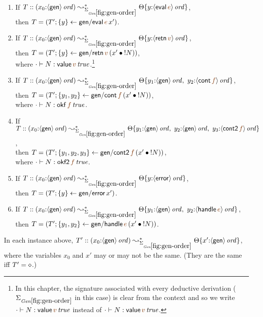 \bigskip
\begin{lemma}~
\begin{enumerate}
\item If 
   $T :: (x_0{:}\istrue{\susp{\sf gen}}) \leadsto^*_{\siggenorder}
         \tackon{\Theta}{y{:}\istrue{\susp{{\sf eval}\,\lf{e}}}}$,
\\ then 
   $T = \left(T'; \trstep{y}{{\sf gen/eval}\,\lf{e}\,x'}\right)$.
\medskip
\item If 
   $T :: (x_0{:}\istrue{\susp{\sf gen}}) \leadsto^*_{\siggenorder}
         \tackon{\Theta}{y{:}\istrue{\susp{{\sf retn}\,\lf{v}}}}$,
\\ then 
   $T = \left(T'; \trstep{y}{{\sf gen/retn}\,\lf{v}\,(\tfuser{x'}{\tbangr{N}})}\right)$,
\\ where 
   $\cdot \vdash N : \isconc{{{{\sf value}\,\lf{v}}}}$.\footnote{In this
chapter, the signature associated with every deductive derivation
($\siggenorder$ in this case)
is clear from the context and so we write 
$\cdot \vdash N : \isconc{{{{\sf value}\,\lf{v}}}}$ instead of 
$\cdot \vdash N : \isconc{{{{\sf value}\,\lf{v}}}}$.}
\medskip
\item If 
   $T :: (x_0{:}\istrue{\susp{\sf gen}}) \leadsto^*_{\siggenorder}
         \tackon{\Theta}{y_1{:}\istrue{\susp{{\sf gen}}}, ~
                         y_2{:}\istrue{\susp{{\sf cont}\,\lf{f}}}}$,
\\ then 
   $T = \left(T'; \trstep{y_1,y_2}{{\sf gen/cont}\,\lf{f}\,(\tfuser{x'}{\tbangr{N}})}\right)$,
\\ where 
   $\cdot \vdash N : \isconc{{{{\sf okf}\,\lf{f}}}}$.
\medskip
\item If
   $T :: (x_0{:}\istrue{\susp{\sf gen}}) \leadsto^*_{\siggenorder}
         \tackon{\Theta}{y_1{:}\istrue{\susp{{\sf gen}}}, ~
                         y_2{:}\istrue{\susp{{\sf gen}}}, ~
                         y_3{:}\istrue{\susp{{\sf cont2}\,\lf{f}}}}$,
\\ then 
   $T = \left(T'; \trstep{y_1,y_2,y_3}{{\sf gen/cont2}\,\lf{f}\,(\tfuser{x'}{\tbangr{N}})}\right)$,
\\ where 
   $\cdot \vdash N : \isconc{{{{\sf okf2}\,\lf{f}}}}$.
\medskip
\item If 
   $T :: (x_0{:}\istrue{\susp{\sf gen}}) \leadsto^*_{\siggenorder}
         \tackon{\Theta}{y{:}\istrue{\susp{{\sf error}}}}$,
\\ then 
   $T = \left(T'; \{{y}\} \leftarrow {{\sf gen/error}\,x'}\right)$.
\medskip
\item If 
   $T :: (x_0{:}\istrue{\susp{\sf gen}}) \leadsto^*_{\siggenorder}
         \tackon{\Theta}{y_1{:}\istrue{\susp{{\sf gen}}}, ~
                         y_2{:}\istrue{\susp{{\sf handle}\,\lf{e}}}}$,
\\ then 
   $T = \left(T'; \trstep{y_1,y_2}{{\sf gen/handle}\,\lf{e}\,(\tfuser{x'}{\tbangr{N}})}\right)$.
\medskip
\end{enumerate}
In each instance above, 
$T' :: (x_0{:}\istrue{\susp{\sf gen}}) \leadsto^*_{\siggenorder}
          \tackon{\Theta}{x'{:}\istrue{\susp{{\sf gen}}}}$,
where the variables $x_0$ and $x'$ may or may not
be the same. (They are the same iff $T' = \diamond$.)
\end{lemma}

